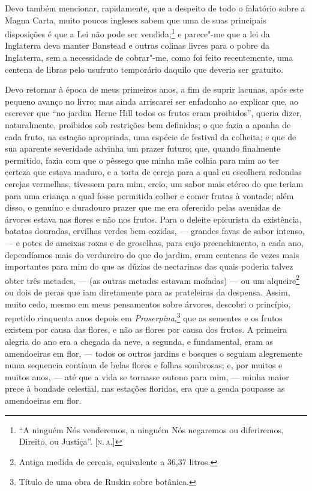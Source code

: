 Devo também mencionar, rapidamente, que a despeito de todo o falatório
sobre a Magna Carta, muito poucos ingleses sabem que uma de suas
principais disposições é que a Lei não pode ser vendida;\footnote{``A
  ninguém Nós venderemos, a ninguém Nós negaremos ou diferiremos,
  Direito, ou Justiça''. {[}\textsc{n.\,a.}{]}} e parece"-me que a lei da
Inglaterra deva manter Banstead e outras colinas livres para o pobre da
Inglaterra, sem a necessidade de cobrar"-me, como foi feito recentemente,
uma centena de libras pelo usufruto temporário daquilo que deveria ser
gratuito.

Devo retornar à época de meus primeiros anos, a fim de suprir
lacunas, após este pequeno avanço no livro; mas ainda arriscarei ser
enfadonho ao explicar que, ao escrever que ``no jardim Herne Hill todos
os frutos eram proibidos'', queria dizer, naturalmente, proibidos sob
restrições bem definidas; o que fazia a apanha de cada fruto, na estação
apropriada, uma espécie de festival da colheita; e que de sua aparente
severidade advinha um prazer futuro; que, quando finalmente permitido,
fazia com que o pêssego que minha mãe colhia para mim ao ter certeza que
estava maduro, e a torta de cereja para a qual eu escolhera redondas
cerejas vermelhas, tivessem para mim, creio, um sabor mais etéreo do que
teriam para uma criança a qual fosse permitida colher e comer frutas à
vontade; além disso, o genuíno e duradouro prazer que me era oferecido
pelas avenidas de árvores estava nas flores e não nos frutos. Para o
deleite epicurista da existência, batatas douradas, ervilhas verdes bem
cozidas, --- grandes favas de sabor intenso, --- e potes de ameixas roxas
e de groselhas, para cujo preenchimento, a cada ano, dependíamos mais do
verdureiro do que do jardim, eram centenas de vezes mais importantes
para mim do que as dúzias de nectarinas das quais poderia talvez obter
três metades, --- (as outras metades estavam mofadas) --- ou um
alqueire\footnote{Antiga medida de cereais, equivalente a 36,37 litros.} ou dois de peras que iam diretamente para as
prateleiras da despensa. Assim, muito cedo, mesmo em meus pensamentos
sobre árvores, descobri o princípio, repetido cinquenta anos depois em
\textit{Proserpina},\footnote{Título de uma obra de Ruskin sobre botânica.} que as sementes e os frutos existem por causa das
flores, e não as flores por causa dos frutos. A primeira alegria do ano
era a chegada da neve, a segunda, e fundamental, eram as amendoeiras em
flor, --- todos os outros jardins e bosques o seguiam alegremente numa
sequencia contínua de belas flores e folhas sombrosas; e, por muitos e
muitos anos, --- até que a vida se tornasse outono para mim, --- minha
maior prece à bondade celestial, nas estações floridas, era que a geada
poupasse as amendoeiras em flor.

